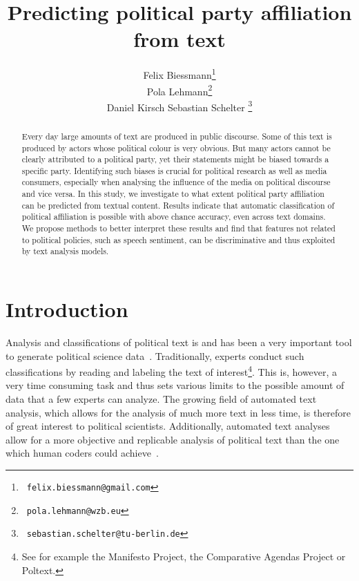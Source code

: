 \documentclass[11pt]{article}
\title{Predicting political party affiliation from text}
\author{Felix Biessmann\thanks{~\tt felix.biessmann@gmail.com}\\
    \And
 Pola Lehmann\thanks{ ~{\tt pola.lehmann@wzb.eu} }\\
\And 
Daniel Kirsch
 \And
  Sebastian Schelter \thanks{~\tt sebastian.schelter@tu-berlin.de}\\ 
}
\date{}
\begin{document}
\maketitle

\begin{abstract}
Every day large amounts of text are produced in public discourse. Some of this text is produced by actors whose political colour is very obvious. But many actors cannot be clearly attributed to a political party, yet their statements might be biased towards a specific party. Identifying such biases is crucial for political research as well as media consumers, especially when analysing the influence of the media on political discourse and vice versa. In this study, we investigate to what extent political party affiliation can be predicted from textual content. Results indicate that automatic classification of political affiliation is possible with above chance accuracy, even across text domains. We propose methods to better interpret these results and find that features not related to political policies, such as speech sentiment, can be discriminative and thus exploited by text analysis models. 
\end{abstract}

\section{Introduction}
\label{sec:intro}
%
Analysis and classifications of political text is and has been a very important tool to generate political science data~\cite{Benoit.Forthcoming}. Traditionally, experts conduct such classifications by reading and labeling the text of interest\footnote{See for example the Manifesto Project, the Comparative Agendas Project or Poltext.}. This is, however, a very time consuming task and thus sets various limits to the possible amount of data that a few experts can analyze. The growing field of automated text analysis, which allows for the analysis of much more text in less time, is therefore of great interest to political scientists. Additionally, automated text analyses allow for a more objective and replicable analysis of political text than the one which human coders could achieve~\cite{Benoit.2}.
\end{document}

